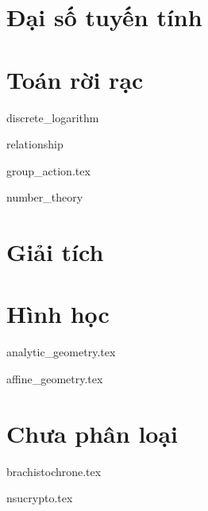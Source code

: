 \documentclass{mynotes}
\begin{document}
%

\tableofcontents

\part{Đại số tuyến tính}



\part{Toán rời rạc}

{discrete_logarithm}

{relationship}

{group_action.tex}

{number_theory}

\part{Giải tích}





\part{Hình học}

{analytic_geometry.tex}

{affine_geometry.tex}

\part{Chưa phân loại}







{brachistochrone.tex}







{nsucrypto.tex}

\printbibliography[heading=bibintoc,title={Tài liệu tham khảo}]
\end{document}
